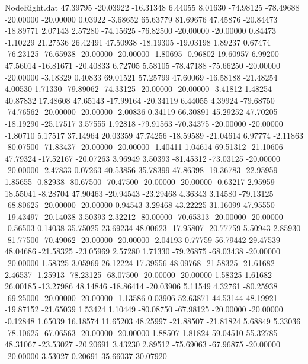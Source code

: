 \begin{filecontents}{NodeRight.dat}
  47.39795  -20.03922  -16.31348     6.44055    8.01630  -74.98125  -78.49688  -20.00000  -20.00000    0.03922   -3.68652   65.63779   81.69676
  47.45876  -20.84473  -18.89771     2.07143    2.57280  -74.15625  -76.82500  -20.00000  -20.00000    0.84473   -1.10229   21.27536   26.42491
  47.50938  -18.19305  -19.03198     1.89237    0.67474  -76.23125  -76.65938  -20.00000  -20.00000   -1.80695   -0.96802   19.60957    6.99200
  47.56014  -16.81671  -20.40833     6.72705    5.58105  -78.47188  -75.66250  -20.00000  -20.00000   -3.18329    0.40833   69.01521   57.25799
  47.60069  -16.58188  -21.48254     4.00530    1.71330  -79.89062  -74.33125  -20.00000  -20.00000   -3.41812    1.48254   40.87832   17.48608
  47.65143  -17.99164  -20.34119     6.44055    4.39924  -79.68750  -74.76562  -20.00000  -20.00000   -2.00836    0.34119   66.30891   45.29252
  47.70205  -18.19290  -25.17517     3.57555    1.92818  -79.91563  -70.34375  -20.00000  -20.00000   -1.80710    5.17517   37.14964   20.03359
  47.74256  -18.59589  -21.04614     6.97774   -2.11863  -80.07500  -71.83437  -20.00000  -20.00000   -1.40411    1.04614   69.51312  -21.10606
  47.79324  -17.52167  -20.07263     3.96949    3.50393  -81.45312  -73.03125  -20.00000  -20.00000   -2.47833    0.07263   40.53856   35.78399
  47.86398  -19.36783  -22.95959     1.85655   -0.82938  -80.67500  -70.47500  -20.00000  -20.00000   -0.63217    2.95959   18.55041   -8.28704
  47.90463  -20.94543  -23.29468     4.36343    3.14580  -79.13125  -68.80625  -20.00000  -20.00000    0.94543    3.29468   43.22225   31.16099
  47.95550  -19.43497  -20.14038     3.50393    2.32212  -80.00000  -70.65313  -20.00000  -20.00000   -0.56503    0.14038   35.75025   23.69234
  48.00623  -17.95807  -20.77759     5.50943    2.85930  -81.77500  -70.49062  -20.00000  -20.00000   -2.04193    0.77759   56.79442   29.47539
  48.04686  -21.58325  -23.05969     2.57280    1.71330  -79.26875  -68.03438  -20.00000  -20.00000    1.58325    3.05969   26.12224   17.39556
  48.09768  -21.58325  -21.61682     2.46537   -1.25913  -78.23125  -68.07500  -20.00000  -20.00000    1.58325    1.61682   26.00185  -13.27986
  48.14846  -18.86414  -20.03906     5.11549    4.32761  -80.25938  -69.25000  -20.00000  -20.00000   -1.13586    0.03906   52.63871   44.53144
  48.19921  -19.87152  -21.65039     1.53424    1.10449  -80.08750  -67.98125  -20.00000  -20.00000   -0.12848    1.65039   16.18574   11.65203
  48.25997  -21.88507  -21.81824     5.68849    5.33036  -78.10625  -67.06563  -20.00000  -20.00000    1.88507    1.81824   59.04510   55.32785
  48.31067  -23.53027  -20.20691     3.43230    2.89512  -75.69063  -67.96875  -20.00000  -20.00000    3.53027    0.20691   35.66037   30.07920

\end{filecontents}
